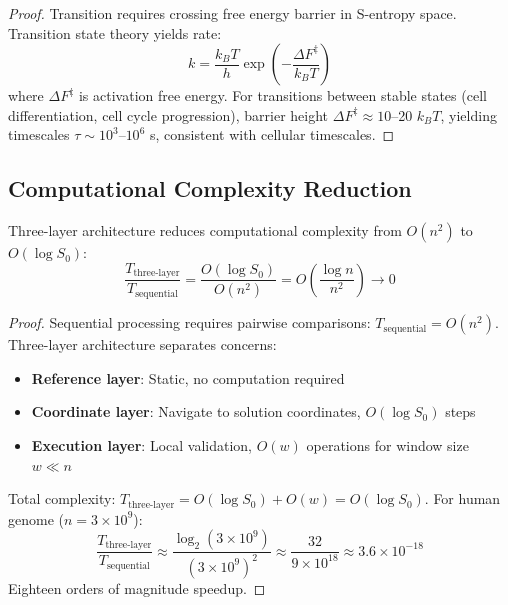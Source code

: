 \begin{proof}
Transition requires crossing free energy barrier in S-entropy space. Transition state theory yields rate:
\begin{equation}
k = \frac{k_BT}{h} \exp\left(-\frac{\Delta F^{\ddagger}}{k_BT}\right)
\end{equation}
where $\Delta F^{\ddagger}$ is activation free energy. For transitions between stable states (cell differentiation, cell cycle progression), barrier height $\Delta F^{\ddagger} \approx 10$--20 $k_BT$, yielding timescales $\tau \sim 10^3$--$10^6$ s, consistent with cellular timescales.
\end{proof}

\subsection{Computational Complexity Reduction}

\begin{theorem}
\label{thm:complexity_reduction}
Three-layer architecture reduces computational complexity from $O(n^2)$ to $O(\log S_0)$:
\begin{equation}
\frac{T_{\text{three-layer}}}{T_{\text{sequential}}} = \frac{O(\log S_0)}{O(n^2)} = O\left(\frac{\log n}{n^2}\right) \to 0
\end{equation}
\end{theorem}

\begin{proof}
Sequential processing requires pairwise comparisons: $T_{\text{sequential}} = O(n^2)$. Three-layer architecture separates concerns:
\begin{itemize}
\item \textbf{Reference layer}: Static, no computation required
\item \textbf{Coordinate layer}: Navigate to solution coordinates, $O(\log S_0)$ steps
\item \textbf{Execution layer}: Local validation, $O(w)$ operations for window size $w \ll n$
\end{itemize}
Total complexity: $T_{\text{three-layer}} = O(\log S_0) + O(w) = O(\log S_0)$. For human genome ($n = 3 \times 10^9$):
\begin{equation}
\frac{T_{\text{three-layer}}}{T_{\text{sequential}}} \approx \frac{\log_2(3 \times 10^9)}{(3 \times 10^9)^2} \approx \frac{32}{9 \times 10^{18}} \approx 3.6 \times 10^{-18}
\end{equation}
Eighteen orders of magnitude speedup.
\end{proof}

